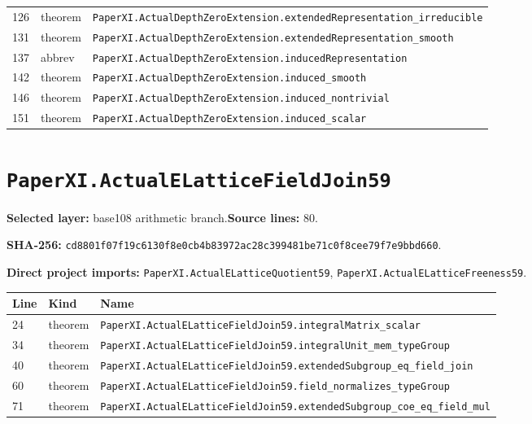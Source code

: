 \documentclass[10pt,oneside]{book}
\begin{document}
\begin{longtable}{@{}p{}p{}p{}@{}}
126&theorem&\nolinkurl{PaperXI.ActualDepthZeroExtension.extendedRepresentation_irreducible}\\

131&theorem&\nolinkurl{PaperXI.ActualDepthZeroExtension.extendedRepresentation_smooth}\\

137&abbrev&\nolinkurl{PaperXI.ActualDepthZeroExtension.inducedRepresentation}\\

142&theorem&\nolinkurl{PaperXI.ActualDepthZeroExtension.induced_smooth}\\

146&theorem&\nolinkurl{PaperXI.ActualDepthZeroExtension.induced_nontrivial}\\

151&theorem&\nolinkurl{PaperXI.ActualDepthZeroExtension.induced_scalar}\\

\bottomrule\end{longtable}

\section{\texorpdfstring{\nolinkurl{PaperXI.ActualELatticeFieldJoin59}}{PaperXI.ActualELatticeFieldJoin59}}\label{module:PaperXI.ActualELatticeFieldJoin59}

\textbf{Selected layer:} base108 arithmetic branch.\quad\textbf{Source lines:} 80.\par\textbf{SHA-256:} {\scriptsize\nolinkurl{cd8801f07f19c6130f8e0cb4b83972ac28c399481be71c0f8cee79f7e9bbd660}}.


\textbf{Direct project imports:} \nolinkurl{PaperXI.ActualELatticeQuotient59}, \nolinkurl{PaperXI.ActualELatticeFreeness59}.

\begin{longtable}{@{}p{}p{}p{}@{}}\toprule Line&Kind&Name\\\midrule\endhead

24&theorem&\nolinkurl{PaperXI.ActualELatticeFieldJoin59.integralMatrix_scalar}\\

34&theorem&\nolinkurl{PaperXI.ActualELatticeFieldJoin59.integralUnit_mem_typeGroup}\\

40&theorem&\nolinkurl{PaperXI.ActualELatticeFieldJoin59.extendedSubgroup_eq_field_join}\\

60&theorem&\nolinkurl{PaperXI.ActualELatticeFieldJoin59.field_normalizes_typeGroup}\\

71&theorem&\nolinkurl{PaperXI.ActualELatticeFieldJoin59.extendedSubgroup_coe_eq_field_mul}\\

\bottomrule\end{longtable}
\end{document}
